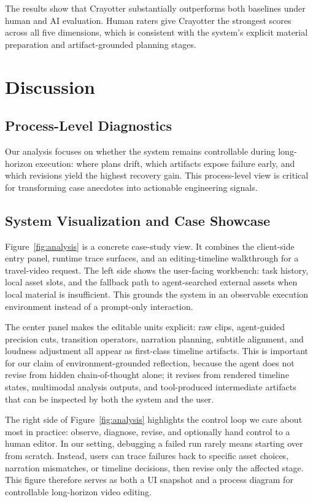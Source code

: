 ﻿\documentclass[11pt]{article}
\begin{document}
The results show that Crayotter substantially outperforms both baselines under
human and AI evaluation. Human raters give Crayotter the strongest scores across
all five dimensions, which is consistent with the system's explicit material
preparation and artifact-grounded planning stages.

\section{Discussion}

\subsection{Process-Level Diagnostics}

Our analysis focuses on whether the system remains controllable during
long-horizon execution: where plans drift, which artifacts expose failure early,
and which revisions yield the highest recovery gain. This process-level view is
critical for transforming case anecdotes into actionable engineering signals.

\subsection{System Visualization and Case Showcase}

Figure~\ref{fig:analysis} is a concrete case-study view. It combines the
client-side entry panel, runtime trace surfaces, and an editing-timeline
walkthrough for a travel-video request. The left side
shows the user-facing workbench: task history, local asset slots, and the
fallback path to agent-searched external assets when local material is
insufficient. This grounds the system in an observable execution environment
instead of a prompt-only interaction.


The center panel makes the editable units explicit: raw clips, agent-guided
precision cuts, transition operators, narration planning, subtitle alignment,
and loudness adjustment all appear as first-class timeline artifacts. This is
important for our claim of environment-grounded reflection, because the agent
does not revise from hidden chain-of-thought alone; it revises from rendered
timeline states, multimodal analysis outputs, and tool-produced intermediate
artifacts that can be inspected by both the system and the user.

The right side of Figure~\ref{fig:analysis} highlights the control loop we care
about most in practice: observe, diagnose, revise, and optionally hand control
to a human editor. In our setting, debugging a failed run rarely means starting
over from scratch. Instead, users can trace failures back to specific asset
choices, narration mismatches, or timeline decisions, then revise only the
affected stage. This figure therefore serves as both a UI snapshot and a
process diagram for controllable long-horizon video editing.
\end{document}
